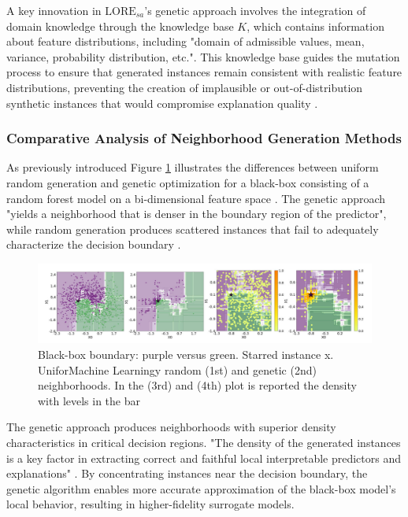 A key innovation in $\text{LORE}_{sa}$'s genetic approach involves the integration of domain knowledge through the knowledge base $K$, which contains information about feature distributions, including "domain of admissible values, mean, variance, probability distribution, etc.". This knowledge base guides the mutation process to ensure that generated instances remain consistent with realistic feature distributions, preventing the creation of implausible or out-of-distribution synthetic instances that would compromise explanation quality \cite{guidotti2022stable}.

\subsubsection{Comparative Analysis of Neighborhood Generation Methods}

As previously introduced Figure \ref{fig:LORE_sa_black_box_boundary} illustrates the differences between uniform random generation and genetic optimization for a black-box consisting of a random forest model on a bi-dimensional feature space \cite{guidotti2022stable}. The genetic approach "yields a neighborhood that is denser in the boundary region of the predictor", while random generation produces scattered instances that fail to adequately characterize the decision boundary \cite{guidotti2022stable}.

\begin{figure}
    \centering
    \includegraphics[width=0.9\linewidth]{images/LORE_sa_black_box_boundary.png}
    \caption{Black-box boundary: purple versus green. Starred instance x. UniforMachine Learningy random (1st) and genetic (2nd) neighborhoods. In the (3rd) and (4th) plot is reported the density with levels in the bar}
    \label{fig:LORE_sa_black_box_boundary}
\end{figure}

The genetic approach produces neighborhoods with superior density characteristics in critical decision regions. "The density of the generated instances is a key factor in extracting correct and faithful local interpretable predictors and explanations" \cite{guidotti2022stable}. By concentrating instances near the decision boundary, the genetic algorithm enables more accurate approximation of the black-box model's local behavior, resulting in higher-fidelity surrogate models.

